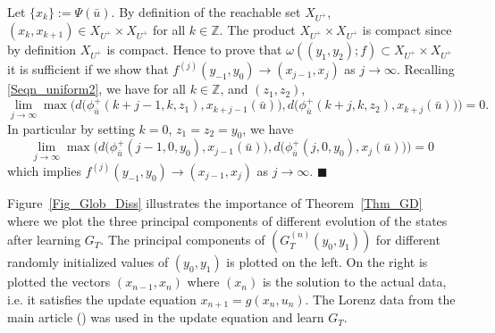 \documentclass[12 pt]{article}
\begin{document}
 
 
Let $\{x_k\} :=  \Psi(\bar{u})$. By definition of the reachable set $X_{U^{+}}$,   $(x_{k},x_{k+1}) \in X_{U^{+}} \times X_{U^{+}}$ for all $k \in \mathbb{Z}$. The product  $X_{U^{+}} \times X_{U^{+}}$ is compact since by definition $X_{U^{+}}$ is compact. Hence to prove that 
 $\omega((y_1,y_2); f)\subset X_{U^{+}} \times X_{U^{+}}$ it is sufficient if we show that 
$f^{(j)}(y_{-1},y_0) \to (x_{j-1},x_{j})$ as $j \to \infty$. Recalling \eqref{Seqn_uniform2}, we have  for all $k \in \mathbb{Z}$, and $(z_1,z_2)$,  $$\lim_{j\to \infty}\max\Bigg(d\Big(\phi_{\bar{u}}^+(k+j-1,k,z_1), x_{k+j-1}(\bar{u})\Big),
	d\Big(\phi_{\bar{u}}^+(k+j,k,z_2), x_{k+j}(\bar{u})\Big)\Bigg) = 0.$$  
 In particular by setting $k=0$, $z_1=z_2=y_0$, we have 
 $$\lim_{j\to \infty}\max\Bigg(d\Big(\phi_{\bar{u}}^+(j-1,0,y_0), x_{j-1}(\bar{u})\Big),
	d\Big(\phi_{\bar{u}}^+(j,0,y_0), x_{j}(\bar{u})\Big)\Bigg) = 0$$ which implies  $f^{(j)}(y_{-1},y_{0}) \to (x_{j-1},x_{j})$ as $j \to \infty$. 
$\blacksquare$

Figure~\ref{Fig_Glob_Diss} illustrates the importance of Theorem~\ref{Thm_GD} where we plot the three principal components of different evolution of the states after learning $G_T$. The principal components of $(G_T^{(n)}(y_0,y_1))$ for different randomly initialized values of $(y_0,y_1)$ is plotted on the left. On the right is plotted the vectors $(x_{n-1},x_n)$ where $(x_n)$ is the solution to the actual data, i.e. it satisfies the update equation $x_{n+1}=g(x_n,u_n)$. 
The Lorenz data from the main article (\cite[Fig.~\ref{Fig_1}B]{Main_article}) was used in the update equation and learn $G_T$. 



\end{document}
